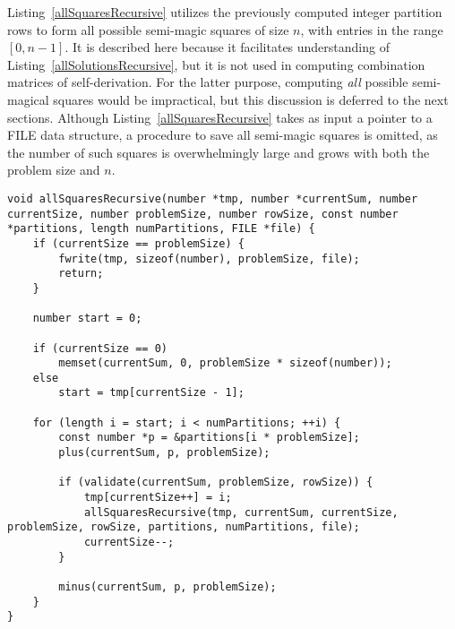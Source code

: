 Listing~\ref{allSquaresRecursive} utilizes the previously computed integer partition rows to form all possible semi-magic squares of size $n$, with entries in the range $[0, n - 1]$. It is described here because it facilitates understanding of Listing~\ref{allSolutionsRecursive}, but it is not used in computing combination matrices of self-derivation. For the latter purpose, computing \emph{all} possible semi-magical squares would be impractical, but this discussion is deferred to the next sections. Although Listing~\ref{allSquaresRecursive} takes as input a pointer to a FILE data structure, a procedure to save all semi-magic squares is omitted, as the number of such squares is overwhelmingly large and grows with both the problem size and $n$.

\begin{lstlisting}[caption={Recursively computing all semi-magic squares of a certain size.},label={allSquaresRecursive}]
void allSquaresRecursive(number *tmp, number *currentSum, number currentSize, number problemSize, number rowSize, const number *partitions, length numPartitions, FILE *file) {
    if (currentSize == problemSize) {
        fwrite(tmp, sizeof(number), problemSize, file);
        return;
    }

    number start = 0;

    if (currentSize == 0)
        memset(currentSum, 0, problemSize * sizeof(number));
    else
        start = tmp[currentSize - 1];

    for (length i = start; i < numPartitions; ++i) {
        const number *p = &partitions[i * problemSize];
        plus(currentSum, p, problemSize);

        if (validate(currentSum, problemSize, rowSize)) {
            tmp[currentSize++] = i;
            allSquaresRecursive(tmp, currentSum, currentSize, problemSize, rowSize, partitions, numPartitions, file);
            currentSize--;
        }

        minus(currentSum, p, problemSize);
    }
}
\end{lstlisting}

